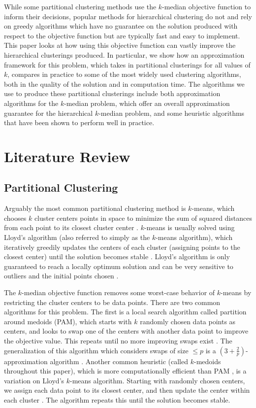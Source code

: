 \documentclass[conference, 10pt, final]{IEEEtran}
\begin{document}
While some partitional clustering methods use the $k$-median objective function to inform their decisions, popular methods for hierarchical clustering do not and rely on greedy algorithms which have no guarantee on the solution produced with respect to the objective function but are typically fast and easy to implement. This paper looks at how using this objective function can vastly improve the hierarchical clusterings produced. 
In particular, we show how an approximation framework for this problem, which takes in partitional clusterings for all values of $k$, compares in practice to some of the most widely used clustering algorithms, both in the quality of the solution and in computation time. The algorithms we use to produce these partitional clusterings include both approximation algorithms for the $k$-median problem, which offer an overall approximation guarantee for the hierarchical $k$-median problem, and some heuristic algorithms that have been shown to perform well in practice. 

\section{Literature Review}

\subsection{Partitional Clustering}
Arguably the most common partitional clustering method is $k$-means, which chooses $k$ cluster centers points in space to minimize the sum of squared distances from each point to its closest cluster center \cite{Jain}.  $k$-means is usually solved using Lloyd's algorithm (also referred to simply as the $k$-means algorithm), which iteratively greedily updates the centers of each cluster (assigning points to the closest center) until the solution becomes stable \cite{Jain}. Lloyd's algorithm is only guaranteed to reach a locally optimum solution and can be very sensitive to outliers and the initial points chosen \cite{Kanungo}.

The $k$-median objective function removes some worst-case behavior of $k$-means by restricting the cluster centers to be data points.  There are two common algorithms for this problem. The first is a local search algorithm called partition around medoids (PAM), which starts with $k$ randomly chosen data points as centers, and looks to swap one of the centers with another data point to improve the objective value. This repeats until no more improving swaps exist \cite{ESL}. The generalization of this algorithm which considers swaps of size $\leq p$ is a $(3 + \frac{2}{p})$-approximation algorithm \cite{Arya}.
Another common heuristic (called $k$-medoids throughout this paper), which is more computationally efficient than PAM \cite{Park}, is a variation on Lloyd's $k$-means algorithm.  Starting with randomly chosen centers, we assign each data point to its closest center, and then update the center within each cluster \cite{Park}. The algorithm repeats this until the solution becomes stable.
\end{document}
